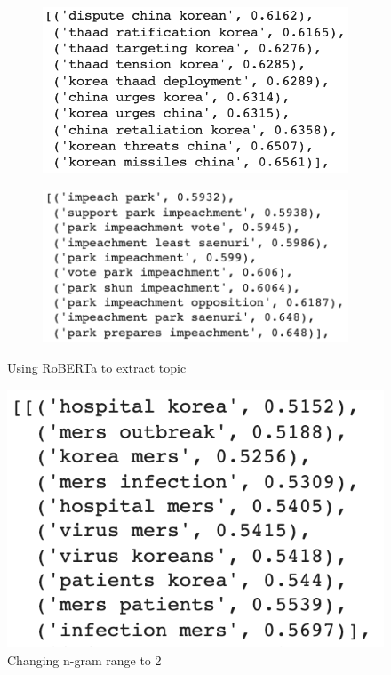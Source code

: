 \documentclass[sigconf,authorversion,nonacm]{acmart}
\begin{document}
\begin{figure}[ht]
    \begin{subfigure}{0.5\linewidth}
        \includegraphics[width=0.9\linewidth]{img/title_bert.png}
    \end{subfigure}%
    \begin{subfigure}{0.5\linewidth}
        \includegraphics[width=\linewidth]{img/title_bert2.png}
    \end{subfigure}
    \caption{Using RoBERTa to extract topic}
    \label{fig:bert-extract}
\end{figure}

\begin{figure}[ht]
    \includegraphics[width=0.5\linewidth]{img/title_bert3.png}
    \caption{Changing n-gram range to 2}
    \label{fig:bert-2}
\end{figure}
\end{document}
